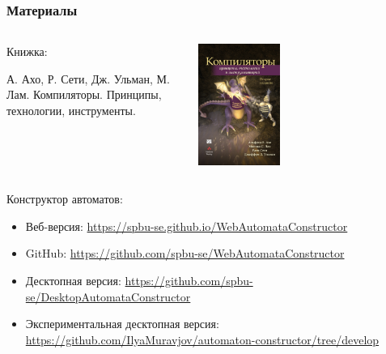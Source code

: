 \documentclass{../../slides-style}
\begin{document}
    \begin{frame}
        \frametitle{Материалы}
        \begin{columns}
            \begin{column}{0.5\textwidth}
                Книжка:

                А. Ахо, Р. Сети, Дж. Ульман, М. Лам. Компиляторы. Принципы, технологии, инструменты.
            \end{column}
            \begin{column}{0.5\textwidth}
                \begin{center}
                    \includegraphics[width=0.38\textwidth]{compilersCover.png}
                \end{center}
            \end{column}
        \end{columns}

        Конструктор автоматов:
        \begin{itemize}
            \item Веб-версия: \url{https://spbu-se.github.io/WebAutomataConstructor}
            \item GitHub: \url{https://github.com/spbu-se/WebAutomataConstructor}
            \item Десктопная версия: \url{https://github.com/spbu-se/DesktopAutomataConstructor}
            \item Экспериментальная десктопная версия: \url{https://github.com/IlyaMuravjov/automaton-constructor/tree/develop}
        \end{itemize}
    \end{frame}
\end{document}
